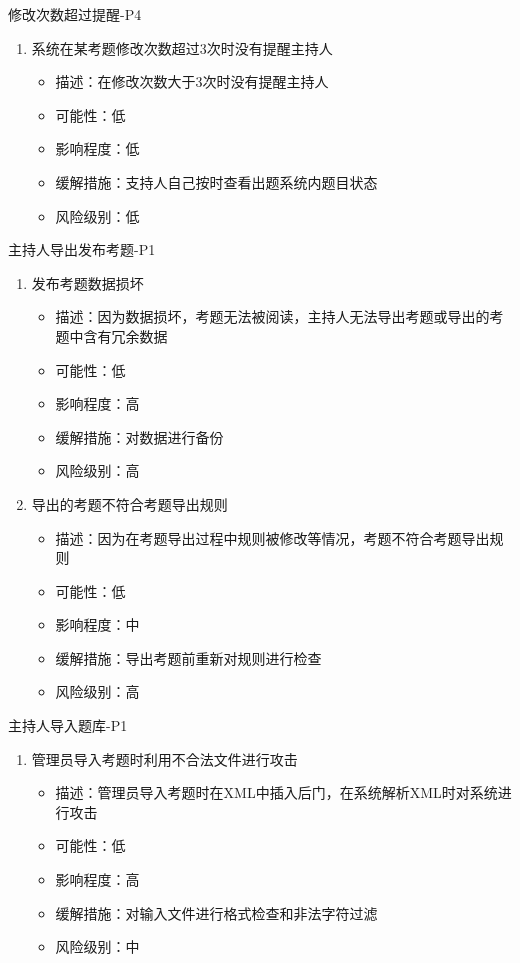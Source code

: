 \documentclass[hyperref, a4paper]{ctexart}
\providecommand{\tightlist}{%
  \setlength{\itemsep}{0pt}\setlength{\parskip}{0pt}}
\begin{document}
修改次数超过提醒-P4

\begin{enumerate}
\def\labelenumi{\arabic{enumi}.}
\tightlist
\item
  系统在某考题修改次数超过3次时没有提醒主持人

  \begin{itemize}
  \tightlist
  \item
    描述：在修改次数大于3次时没有提醒主持人
  \item
    可能性：低
  \item
    影响程度：低
  \item
    缓解措施：支持人自己按时查看出题系统内题目状态
  \item
    风险级别：低
  \end{itemize}
\end{enumerate}

主持人导出发布考题-P1

\begin{enumerate}
\def\labelenumi{\arabic{enumi}.}
\tightlist
\item
  发布考题数据损坏

  \begin{itemize}
  \tightlist
  \item
    描述：因为数据损坏，考题无法被阅读，主持人无法导出考题或导出的考题中含有冗余数据
  \item
    可能性：低
  \item
    影响程度：高
  \item
    缓解措施：对数据进行备份
  \item
    风险级别：高
  \end{itemize}
\item
  导出的考题不符合考题导出规则

  \begin{itemize}
  \tightlist
  \item
    描述：因为在考题导出过程中规则被修改等情况，考题不符合考题导出规则
  \item
    可能性：低
  \item
    影响程度：中
  \item
    缓解措施：导出考题前重新对规则进行检查
  \item
    风险级别：高
  \end{itemize}
\end{enumerate}

主持人导入题库-P1

\begin{enumerate}
\def\labelenumi{\arabic{enumi}.}
\tightlist
\item
  管理员导入考题时利用不合法文件进行攻击

  \begin{itemize}
  \tightlist
  \item
    描述：管理员导入考题时在XML中插入后门，在系统解析XML时对系统进行攻击
  \item
    可能性：低
  \item
    影响程度：高
  \item
    缓解措施：对输入文件进行格式检查和非法字符过滤
  \item
    风险级别：中
  \end{itemize}
\end{enumerate}
\end{document}
